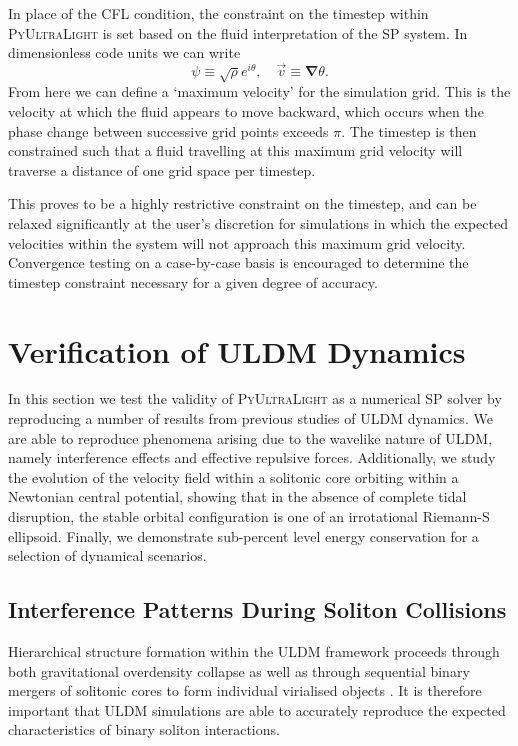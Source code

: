 \documentclass[a4paper,11pt]{article}
\newcommand{\PyUltraLight}{\textsc{PyUltraLight }}
\begin{document}
In place of the CFL condition, the constraint on the timestep within \PyUltraLight is set based on the fluid interpretation of the SP system. In dimensionless code units we can write 
\begin{equation}
    \psi\equiv\sqrt{\rho}e^{i\theta}, \quad \vec{v}\equiv\boldsymbol{\nabla}\theta.
\end{equation}
From here we can define a `maximum velocity' for the simulation grid. This is the velocity at which the fluid appears to move backward, which occurs when the phase change between successive grid points exceeds $\pi$. The timestep is then constrained such that a fluid travelling at this maximum grid velocity will traverse a distance of one grid space per timestep.

This proves to be a highly restrictive constraint on the timestep, and can be relaxed significantly at the user's discretion for simulations in which the expected velocities within the system will not approach this maximum grid velocity. Convergence testing on a case-by-case basis is encouraged to determine the timestep constraint necessary for a given degree of accuracy. 


\section{Verification of ULDM Dynamics}\label{sec:test}

In this section we test the validity of \PyUltraLight as a numerical SP solver by reproducing a number of results from previous studies of ULDM dynamics. We are able to reproduce phenomena arising due to the wavelike nature of ULDM, namely interference effects and effective repulsive forces. Additionally, we study the evolution of the velocity field within a solitonic core orbiting within a Newtonian central potential, showing that in the absence of complete tidal disruption, the stable orbital configuration is one of an irrotational Riemann-S ellipsoid. Finally, we demonstrate sub-percent level energy conservation for a selection of dynamical scenarios.

\subsection{Interference Patterns During Soliton Collisions}\label{sec:interference}

Hierarchical structure formation within the ULDM framework proceeds through both gravitational overdensity collapse as well as through sequential binary mergers of solitonic cores to form individual virialised objects \cite{Schive2014}. It is therefore important that ULDM simulations are able to accurately reproduce the expected characteristics of binary soliton interactions. 
\end{document}
